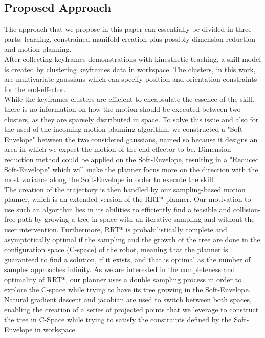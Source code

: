 \documentclass[letterpaper, 10 pt, conference]{ieeeconf}  %
\begin{document}
\subsection{Proposed Approach}

The approach that we propose in this paper can essentially be divided in three parts: learning, constrained manifold creation plus possibly dimension reduction and motion planning.\\
 After collecting keyframes demonstrations with kinesthetic teaching, a skill model is created by clustering keyframes data in workspace. The clusters, in this work, are multivariate gaussians which can specify position and orientation constraints for the end-effector.\\
While the keyframes clusters are efficient to encapsulate the essence of the skill, there is no information on how the motion should be executed between two clusters, as they are sparsely distributed in space. To solve this issue and also for the used of the incoming motion planning algorithm, we constructed a "Soft-Envelope" between the two considered gaussians, named so because it designs an area in which we expect the motion of the end-effector to be. Dimension reduction method could be applied on the Soft-Envelope, resulting in a "Reduced Soft-Envelope" which will make the planner focus more on the direction with the most variance along the Soft-Envelope in order to execute the skill.  \\
The creation of the trajectory is then handled by our sampling-based motion planner, which is an extended version of the RRT* planner.
Our motivation to use such an algorithm lies in its abilities to efficiently find a feasible and collision-free path by growing a tree in space with an iterative sampling and without the user intervention. Furthermore, RRT* is probabilistically complete and asymptotically optimal if the sampling and the growth of the tree are done in the configuration space (C-space) of the robot, meaning that the planner is guaranteed to find a solution, if it exists, and that is optimal as the number of samples approaches infinity.
As we are interested in the completeness and optimality of RRT*, our planner uses a double sampling process in order to explore the C-space while trying to have its tree growing in the Soft-Envelope. Natural gradient descent and jacobian are used to switch between both spaces, enabling the creation of a series of projected points that we leverage to construct the tree in C-Space while trying to satisfy the constraints defined by the Soft-Envelope in workspace.\\
\end{document}
